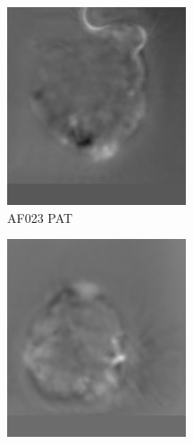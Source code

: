 \begin{figure}
\begin{subfigure}[b]{.24\linewidth}
\includegraphics[width=\linewidth]{Figs/PAT023_23.jpg}
\caption{AF023 PAT}
\end{subfigure}
\begin{subfigure}[b]{.24\linewidth}
\includegraphics[width=\linewidth]{Figs/PAT36.png}

\end{subfigure}
\end{figure}
